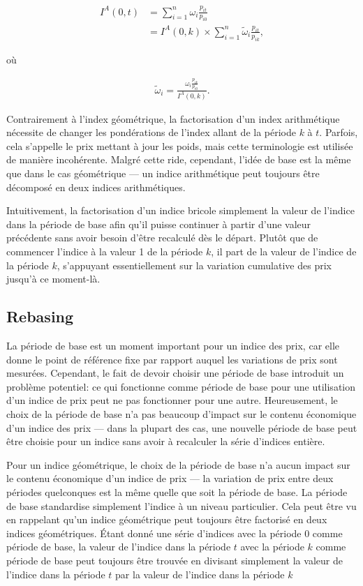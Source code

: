 \documentclass[]{article}
\begin{document}
\begin{align*}
I^{A}(0, t) & = \sum_{i = 1}^{n} \omega_{i} \frac{p_{it}}{p_{i0}} \\
& = I^{A}(0, k) \times \sum_{i = 1}^{n} \tilde{\omega}_{i} \frac{p_{it}}{p_{ik}},
\end{align*}

où

\begin{align*}
\tilde{\omega}_{i} = \frac{\omega_{i} \frac{p_{ik}}{p_{i0}}}{I^{A}(0, k)}.
\end{align*}

Contrairement à l'index géométrique, la factorisation d'un index arithmétique nécessite de changer les pondérations de l'index allant de la période \(k\) à \(t\). Parfois, cela s'appelle le prix mettant à jour les poids, mais cette terminologie est utilisée de manière incohérente. Malgré cette ride, cependant, l'idée de base est la même que dans le cas géométrique --- un indice arithmétique peut toujours être décomposé en deux indices arithmétiques.

Intuitivement, la factorisation d'un indice bricole simplement la valeur de l'indice dans la période de base afin qu'il puisse continuer à partir d'une valeur précédente sans avoir besoin d'être recalculé dès le départ. Plutôt que de commencer l'indice à la valeur 1 de la période \(k\), il part de la valeur de l'indice de la période \(k\), s'appuyant essentiellement sur la variation cumulative des prix jusqu'à ce moment-là.

\hypertarget{rebasing}{%
\subsection{Rebasing}\label{rebasing}}

La période de base est un moment important pour un indice des prix, car elle donne le point de référence fixe par rapport auquel les variations de prix sont mesurées. Cependant, le fait de devoir choisir une période de base introduit un problème potentiel: ce qui fonctionne comme période de base pour une utilisation d'un indice de prix peut ne pas fonctionner pour une autre. Heureusement, le choix de la période de base n'a pas beaucoup d'impact sur le contenu économique d'un indice des prix --- dans la plupart des cas, une nouvelle période de base peut être choisie pour un indice sans avoir à recalculer la série d'indices entière.

Pour un indice géométrique, le choix de la période de base n'a aucun impact sur le contenu économique d'un indice de prix --- la variation de prix entre deux périodes quelconques est la même quelle que soit la période de base. La période de base standardise simplement l'indice à un niveau particulier. Cela peut être vu en rappelant qu'un indice géométrique peut toujours être factorisé en deux indices géométriques. Étant donné une série d'indices avec la période 0 comme période de base, la valeur de l'indice dans la période \(t\) avec la période \(k\) comme période de base peut toujours être trouvée en divisant simplement la valeur de l'indice dans la période \(t\) par la valeur de l'indice dans la période \(k\)
\end{document}

